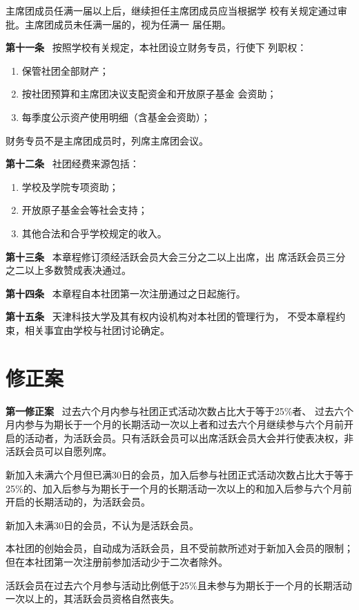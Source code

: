 \documentclass{gbt9704}
\begin{document}
主席团成员任满一届以上后，继续担任主席团成员应当根据学
校有关规定通过审批。主席团成员未任满一届的，视为任满一
届任期。

\textbf{第十一条}~ 按照学校有关规定，本社团设立财务专员，行使下
列职权：
\begin{enumerate}
    \item 保管社团全部财产；
    \item 按社团预算和主席团决议支配资金和开放原子基金
    会资助；
    \item 每季度公示资产使用明细（含基金会资助）；
\end{enumerate}


财务专员不是主席团成员时，列席主席团会议。


\textbf{第十二条}~ 社团经费来源包括：
\begin{enumerate}
    \item 学校及学院专项资助；
    \item 开放原子基金会等社会支持；
    \item 其他合法和合乎学校规定的收入。
\end{enumerate}


\textbf{第十三条}~ 本章程修订须经活跃会员大会三分之二以上出席，出
席活跃会员三分之二以上多数赞成表决通过。


\textbf{第十四条}~ 本章程自本社团第一次注册通过之日起施行。

\textbf{第十五条}~ 天津科技大学及其有权内设机构对本社团的管理行为，
不受本章程约束，相关事宜由学校与社团讨论确定。


\section{修正案}
\textbf{第一修正案}~ 过去六个月内参与社团正式活动次数占比大于等于25\%者、
过去六个月内参与为期长于一个月的长期活动一次以上者和过去六个月继续参与六个月前开启的活动者，为活跃会员。只有活跃会员可以出席活跃会员大会并行使表决权，非活跃会员可以自愿列席。

新加入未满六个月但已满30日的会员，加入后参与社团正式活动次数占比大于等于25\%的、加入后参与为期长于一个月的长期活动一次以上的和加入后参与六个月前开启的长期活动的，为活跃会员。

新加入未满30日的会员，不认为是活跃会员。

本社团的创始会员，自动成为活跃会员，且不受前款所述对于新加入会员的限制；但在本社团第一次注册前参加活动少于二次者除外。

活跃会员在过去六个月参与活动比例低于25\%且未参与为期长于一个月的长期活动一次以上的，其活跃会员资格自然丧失。
\end{document}
